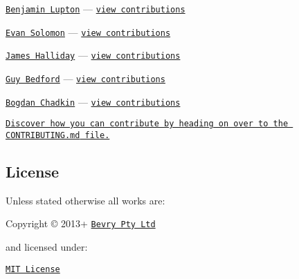 \begin{DoxyItemize}
\item \href{http://balupton.com}{\tt Benjamin Lupton} — \href{https://github.com/bevry/domain-browser/commits?author=balupton}{\tt view contributions} 
\item \href{http://evansolomon.me}{\tt Evan Solomon} — \href{https://github.com/bevry/domain-browser/commits?author=evansolomon}{\tt view contributions} 
\item \href{http://substack.net/}{\tt James Halliday} — \href{https://github.com/bevry/domain-browser/commits?author=substack}{\tt view contributions} 
\item \href{twitter.com/guybedford}{\tt Guy Bedford} — \href{https://github.com/bevry/domain-browser/commits?author=guybedford}{\tt view contributions} 
\item \href{https://github.com/TrySound}{\tt Bogdan Chadkin} — \href{https://github.com/bevry/domain-browser/commits?author=TrySound}{\tt view contributions}
\end{DoxyItemize}

\href{https://github.com/bevry/domain-browser/blob/master/CONTRIBUTING.md#files}{\tt Discover how you can contribute by heading on over to the {\ttfamily C\+O\+N\+T\+R\+I\+B\+U\+T\+I\+N\+G.\+md} file.}

\subsection*{License}

Unless stated otherwise all works are\+:


\begin{DoxyItemize}
\item Copyright \copyright{} 2013+ \href{http://bevry.me}{\tt Bevry Pty Ltd}
\end{DoxyItemize}

and licensed under\+:


\begin{DoxyItemize}
\item \href{http://spdx.org/licenses/MIT.html}{\tt M\+IT License}
\end{DoxyItemize}